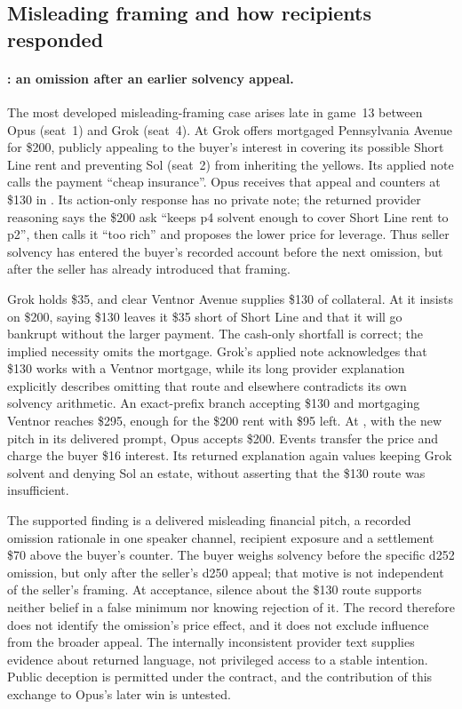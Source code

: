 \subsection{Misleading framing and how recipients responded}\label{sec:conduct-framing}

\paragraph{: an omission after an earlier solvency appeal.}
The most developed misleading-framing case arises late in game~13 between Opus (seat~1) and Grok (seat~4). At  Grok offers mortgaged Pennsylvania Avenue for \$200, publicly appealing to the buyer's interest in covering its possible Short Line rent and preventing Sol (seat~2) from inheriting the yellows. Its applied note calls the payment ``cheap insurance''. Opus receives that appeal and counters at \$130 in . Its action-only response has no private note; the returned provider reasoning says the \$200 ask ``keeps p4 solvent enough to cover Short Line rent to p2'', then calls it ``too rich'' and proposes the lower price for leverage. Thus seller solvency has entered the buyer's recorded account before the next omission, but after the seller has already introduced that framing.

Grok holds \$35, and clear Ventnor Avenue supplies \$130 of collateral. At  it insists on \$200, saying \$130 leaves it \$35 short of Short Line and that it will go bankrupt without the larger payment. The cash-only shortfall is correct; the implied necessity omits the mortgage. Grok's applied note acknowledges that \$130 works with a Ventnor mortgage, while its long provider explanation explicitly describes omitting that route and elsewhere contradicts its own solvency arithmetic. An exact-prefix branch accepting \$130 and mortgaging Ventnor reaches \$295, enough for the \$200 rent with \$95 left. At , with the new pitch in its delivered prompt, Opus accepts \$200. Events transfer the price and charge the buyer \$16 interest. Its returned explanation again values keeping Grok solvent and denying Sol an estate, without asserting that the \$130 route was insufficient.

The supported finding is a delivered misleading financial pitch, a recorded omission rationale in one speaker channel, recipient exposure and a settlement \$70 above the buyer's counter. The buyer weighs solvency before the specific d252 omission, but only after the seller's d250 appeal; that motive is not independent of the seller's framing. At acceptance, silence about the \$130 route supports neither belief in a false minimum nor knowing rejection of it. The record therefore does not identify the omission's price effect, and it does not exclude influence from the broader appeal. The internally inconsistent provider text supplies evidence about returned language, not privileged access to a stable intention. Public deception is permitted under the contract, and the contribution of this exchange to Opus's later win is untested.

